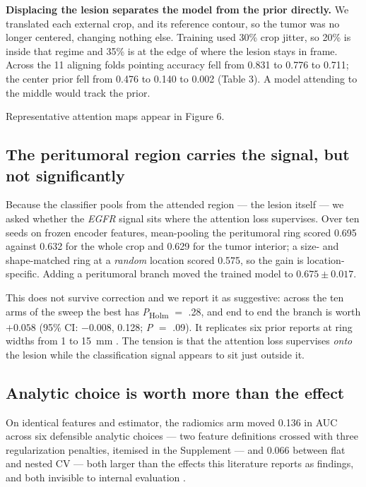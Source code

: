 \documentclass[11pt]{article}
\begin{document}
\textbf{Displacing the lesion separates the model from the prior directly.} We
translated each external crop, and its reference contour, so the tumor was no
longer centered, changing nothing else. Training used 30\% crop jitter, so 20\% is
inside that regime and 35\% is at the edge of where the lesion stays in frame.
Across the 11 aligning folds pointing accuracy fell from 0.831 to 0.776 to 0.711;
the center prior fell from 0.476 to 0.140 to 0.002 (Table 3). A model attending to
the middle would track the prior.

Representative attention maps appear in Figure 6.

\subsection*{The peritumoral region carries the signal, but not significantly}

Because the classifier pools from the attended region --- the lesion itself --- we
asked whether the \textit{EGFR} signal sits where the attention loss supervises.
Over ten seeds on frozen encoder features, mean-pooling the peritumoral ring
scored 0.695 against 0.632 for the whole crop and 0.629 for the tumor interior; a
size- and shape-matched ring at a \textit{random} location scored 0.575, so the
gain is location-specific. Adding a peritumoral branch moved the trained model to
$0.675 \pm 0.017$.

This does not survive correction and we report it as suggestive: across the ten
arms of the sweep the best has \textit{P}\textsubscript{Holm} $=$ .28, and end to
end the branch is worth $+0.058$ (95\% CI: $-0.008$, 0.128; \textit{P} $=$ .09). It
replicates six prior reports at ring widths from 1 to 15~mm
\citep{yamazaki2022,shang2023,wu2024,le2026,lai2026,huang2025}. The tension is that
the attention loss supervises \textit{onto} the lesion while the classification
signal appears to sit just outside it.

\subsection*{Analytic choice is worth more than the effect}

On identical features and estimator, the radiomics arm moved 0.136 in AUC across
six defensible analytic choices --- two feature definitions crossed with three
regularization penalties, itemised in the Supplement --- and 0.066 between flat
and nested CV --- both
larger than the effects this literature reports as findings, and both invisible to
internal evaluation \citep{maleki2022}.
\end{document}
